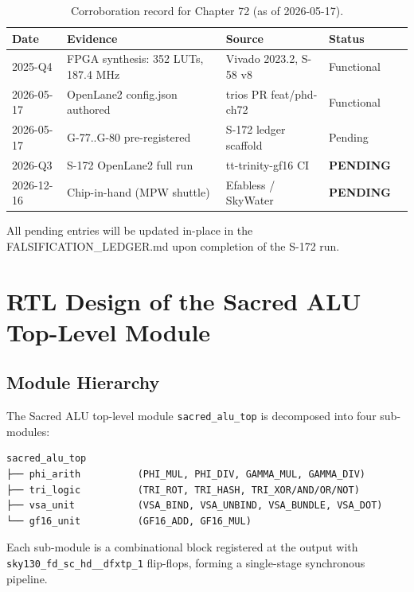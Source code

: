 \begin{table}[H]
\centering
\caption{Corroboration record for Chapter 72 (as of 2026-05-17).}
\label{tab:72:corroboration}
\begin{tabular}{lllll}
\toprule
Date & Evidence & Source & Status \\
\midrule
2025-Q4 & FPGA synthesis: 352 LUTs, 187.4 MHz & Vivado 2023.2, S-58 v8 & Functional \\
2026-05-17 & OpenLane2 config.json authored & trios PR feat/phd-ch72 & Functional \\
2026-05-17 & G-77..G-80 pre-registered & S-172 ledger scaffold & Pending \\
2026-Q3 & S-172 OpenLane2 full run & tt-trinity-gf16 CI & \textbf{PENDING} \\
2026-12-16 & Chip-in-hand (MPW shuttle) & Efabless / SkyWater & \textbf{PENDING} \\
\bottomrule
\end{tabular}
\end{table}

\noindent
All pending entries will be updated in-place in the FALSIFICATION\_LEDGER.md
upon completion of the S-172 run.

\section{RTL Design of the Sacred ALU Top-Level Module}
\label{sec:72:rtl-design}

\subsection{Module Hierarchy}
\label{subsec:72:module-hierarchy}

The Sacred ALU top-level module \texttt{sacred\_alu\_top} is decomposed
into four sub-modules:

\begin{verbatim}
sacred_alu_top
├── phi_arith          (PHI_MUL, PHI_DIV, GAMMA_MUL, GAMMA_DIV)
├── tri_logic          (TRI_ROT, TRI_HASH, TRI_XOR/AND/OR/NOT)
├── vsa_unit           (VSA_BIND, VSA_UNBIND, VSA_BUNDLE, VSA_DOT)
└── gf16_unit          (GF16_ADD, GF16_MUL)
\end{verbatim}

Each sub-module is a combinational block registered at the output
with \texttt{sky130\_fd\_sc\_hd\_\_dfxtp\_1} flip-flops,
forming a single-stage synchronous pipeline.

